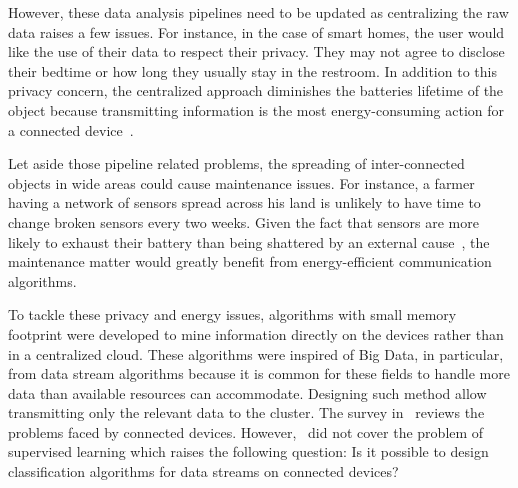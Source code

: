 However, these data analysis pipelines need to be
updated as centralizing the raw data raises a
few issues.
For instance, in the case of smart homes, the
user would like the use of their data to respect
their privacy.
They may not agree to disclose their bedtime or
how long they usually stay in the restroom.
In addition to this privacy concern, the
centralized approach diminishes the batteries
lifetime of the object because transmitting
information is the most energy-consuming action
for a connected
device~\cite{sensor-network-survey,
sensor-energy-model}.  

Let aside those pipeline related problems, the
spreading of inter-connected objects in wide
areas could cause maintenance issues. For instance,
a farmer having a network of sensors spread across
his land is unlikely to have time to change
broken sensors every two weeks. Given the fact
that sensors are more likely to exhaust their
battery than being shattered by an external
cause~\cite{sensor-network-survey}, the
maintenance matter would greatly benefit from
energy-efficient communication algorithms.



To tackle these privacy and energy issues,
algorithms with small memory footprint were
developed to mine information directly on the
devices rather than in a centralized cloud.  These
algorithms were inspired of Big Data, in
particular, from data stream algorithms because it
is common for these fields to handle more data
than available resources can accommodate.
Designing such method allow transmitting only the
relevant data to the cluster. The survey
in~\cite{kejariwal2015} reviews the problems faced
by connected devices.
However,~\cite{kejariwal2015} did not cover the
problem of supervised learning which raises the
following question: Is it possible to design
classification algorithms for data streams on
connected devices? 

